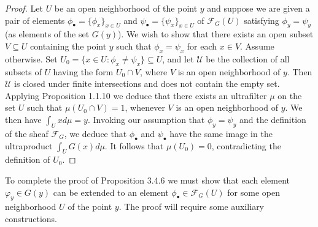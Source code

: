 \documentclass[11pt]{article}
\theoremstyle{plain}
\theoremstyle{definition}
\begin{document}
\begin{proof}
Let $U$ be an open neighborhood of the point $y$ and suppose we are given a pair of elements $\phi_\bullet = \{\phi_x\}_{x \in U}$ and $\psi_\bullet = \{\psi_x\}_{x \in U}$ of $\mathscr{F}_G(U)$ satisfying $\phi_y = \psi_y$ (as elements of the set $G(y)$). We wish to show that there exists an open subset $V \subseteq U$ containing the point $y$ such that $\phi_x = \psi_x$ for each $x \in V$. Assume otherwise. Set $U_0 = \{x \in U : \phi_x \neq \psi_x\} \subseteq U$, and let $\mathcal{U}$ be the collection of all subsets of $U$ having the form $U_0 \cap V$, where $V$ is an open neighborhood of $y$. Then $\mathcal{U}$ is closed under finite intersections and does not contain the empty set. Applying Proposition 1.1.10 we deduce that there exists an ultrafilter $\mu$ on the set $U$ such that $\mu(U_0 \cap V) = 1$, whenever $V$ is an open neighborhood of $y$. We then have $\int_U x d\mu = y$. Invoking our assumption that $\phi_y = \psi_y$ and the definition of the sheaf $\mathscr{F}_G$, we deduce that $\phi_\bullet$ and $\psi_\bullet$ have the same image in the ultraproduct $\int_U G(x)d\mu$. It follows that $\mu(U_0) = 0$, contradicting the definition of $U_0$.
\end{proof}


To complete the proof of Proposition 3.4.6 we must show that each element $\varphi_y \in G(y)$ can be extended to an element $\phi_\bullet \in \mathscr{F}_G(U)$ for some open neighborhood $U$ of the point $y$. The proof will require some auxiliary constructions.
\end{document}
